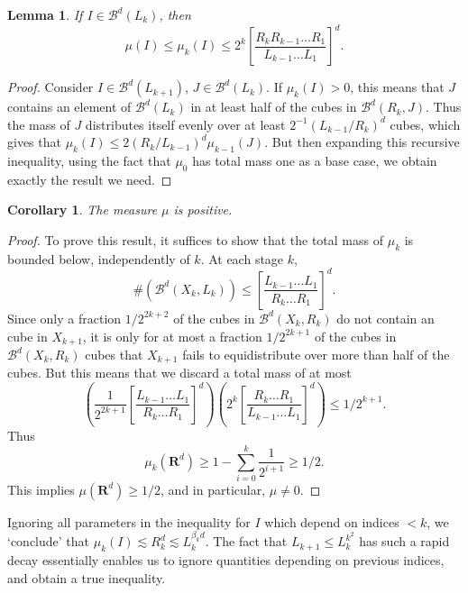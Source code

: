 \documentclass[usenames,dvipsnames]{article}
\theoremstyle{plain}
\newtheorem{lemma}{Lemma}
\newtheorem{corollary}{Corollary}
\theoremstyle{plain}
\begin{document}
\begin{lemma}
	If $I \in \mathcal{B}^d(L_k)$, then
	\[ \mu(I) \leq \mu_k(I) \leq 2^k \left[ \frac{R_k R_{k-1} \dots R_1}{L_{k-1} \dots L_1} \right]^d. \]
\end{lemma}
\begin{proof}
	Consider $I \in \mathcal{B}^d(L_{k+1})$, $J \in \mathcal{B}^d(L_k)$. If $\mu_k(I) > 0$, this means that $J$ contains an element of $\mathcal{B}^d(L_k)$ in at least half of the cubes in $\mathcal{B}^d(R_k,J)$. Thus the mass of $J$ distributes itself evenly over at least $2^{-1} (L_{k-1}/R_k)^d$ cubes, which gives that $\mu_k(I) \leq 2(R_k/L_{k-1})^d \mu_{k-1}(J)$. But then expanding this recursive inequality, using the fact that $\mu_0$ has total mass one as a base case, we obtain exactly the result we need.
\end{proof}

\begin{corollary}
	The measure $\mu$ is positive.
\end{corollary}
\begin{proof}
	To prove this result, it suffices to show that the total mass of $\mu_k$ is bounded below, independently of $k$. At each stage $k$,
	\[ \# (\mathcal{B}^d(X_k,L_k)) \leq \left[ \frac{L_{k-1} \dots L_1}{R_k \dots R_1} \right]^d. \]
	Since only a fraction $1/2^{2k+2}$ of the cubes in $\mathcal{B}^d(X_k,R_k)$ do not contain an cube in $X_{k+1}$, it is only for at most a fraction $1/2^{2k+1}$ of the cubes in $\mathcal{B}^d(X_k,R_k)$ cubes that $X_{k+1}$ fails to equidistribute over more than half of the cubes. But this means that we discard a total mass of at most
	\[ \left( \frac{1}{2^{2k + 1}} \left[ \frac{L_{k-1} \dots L_1}{R_k \dots R_1} \right]^d \right) \left( 2^{k} \left[ \frac{R_k \dots R_1}{L_{k-1} \dots L_1} \right]^d \right) \leq 1/2^{k+1}. \]
	Thus
	\[ \mu_k(\mathbf{R}^d) \geq 1 - \sum_{i = 0}^k \frac{1}{2^{i+1}} \geq 1/2. \]
	This implies $\mu(\mathbf{R}^d) \geq 1/2$, and in particular, $\mu \neq 0$.
\end{proof}

Ignoring all parameters in the inequality for $I$ which depend on indices $< k$, we `conclude' that $\mu_k(I) \lesssim R_k^d \lesssim L_k^{\beta_k d}$. The fact that $L_{k+1} \leq L_k^{k^2}$ has such a rapid decay essentially enables us to ignore quantities depending on previous indices, and obtain a true inequality.
\end{document}
